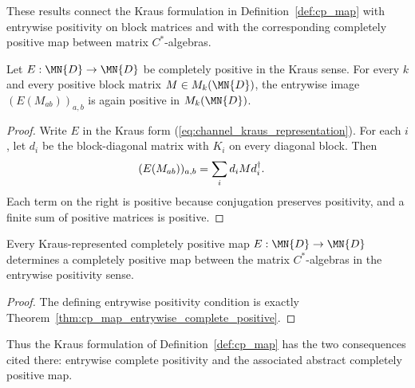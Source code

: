 These results connect the Kraus formulation in
Definition~\ref{def:cp_map} with entrywise positivity on block matrices and
with the corresponding completely positive map between matrix
$C^*$-algebras.

\begin{theorem}
    \label{thm:cp_map_entrywise_complete_positive}
    \leanok
    Let $E : \MN{D} \to \MN{D}$ be completely positive in the Kraus sense.
    For every $k$ and every positive block matrix
    $M \in M_k(\MN{D})$, the entrywise image
    $(E(M_{ab}))_{a,b}$ is again positive in $M_k(\MN{D})$.
\end{theorem}

\begin{proof}\leanok
    Write $E$ in the Kraus form (\ref{eq:channel_kraus_representation}).
    For each $i$, let $d_i$ be the block-diagonal matrix with $K_i$ on every
    diagonal block. Then
    \begin{align}
        (E(M_{ab}))_{a,b}
         & =\sum_i d_i M d_i^\dagger.
        \notag
    \end{align}
    Each term on the right is positive because conjugation preserves
    positivity, and a finite sum of positive matrices is positive.
\end{proof}

\begin{theorem}
    \label{thm:cp_map_to_abstract_completely_positive}
    \leanok
    Every Kraus-represented completely positive map
    $E : \MN{D} \to \MN{D}$ determines a completely positive map between
    the matrix $C^*$-algebras in the entrywise positivity sense.
\end{theorem}

\begin{proof}\leanok
    The defining entrywise positivity condition is exactly
    Theorem~\ref{thm:cp_map_entrywise_complete_positive}.
\end{proof}

Thus the Kraus formulation of Definition~\ref{def:cp_map} has the two
consequences cited there: entrywise complete positivity and the associated
abstract completely positive map.
